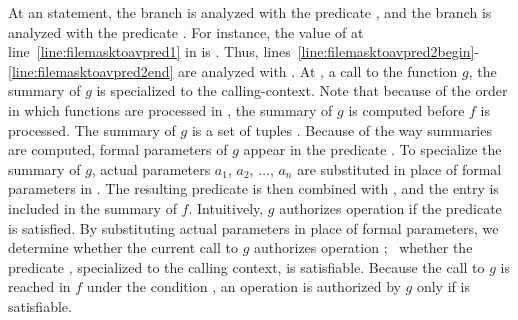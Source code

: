 At an  statement, the  branch is
analyzed with the predicate , and the  branch is
analyzed with the predicate . For instance, the value
of  at line~\ref{line:filemasktoavpred1} in 
is . Thus,
lines~\ref{line:filemasktoavpred2begin}-\ref{line:filemasktoavpred2end} are
analyzed with .  At
, a call to the function $g$, the summary
of $g$ is specialized to the calling-context.  Note that because of the order
in which functions are processed in , the summary
of $g$ is computed before $f$ is processed. The summary of $g$ is a set of
tuples .  Because of the way summaries are computed,
formal parameters of $g$ appear in the predicate .  To specialize
the summary of $g$, actual parameters $a_1$, $a_2$, $\ldots$, $a_n$ are
substituted in place of formal parameters in . The resulting
predicate  is then combined with , and the entry
 is included in the summary of $f$.
Intuitively, $g$ authorizes operation  if the predicate 
is satisfied. By substituting actual parameters in place of formal parameters,
we determine whether the current call to $g$ authorizes operation ;
\ie~whether the predicate , specialized to the calling context, is
satisfiable.  Because the call to $g$ is reached in $f$ under the condition
, an operation is authorized by $g$ only if  is
satisfiable.

